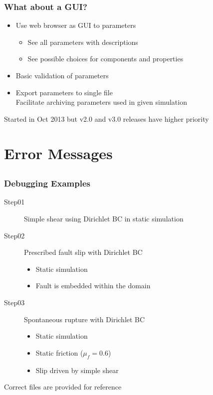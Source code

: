 \documentclass{beamer}
\begin{document}
\begin{frame}
  \frametitle{What about a GUI?}

  \begin{itemize}
  \item Use web browser as GUI to parameters
    \begin{itemize}
    \item See all parameters with descriptions
    \item See possible choices for components and properties
    \end{itemize}
  \item Basic validation of parameters
  \item Export parameters to single file\\
    Facilitate archiving parameters used in given simulation
  \end{itemize}

  \vfill
  Started in Oct 2013 but v2.0 and v3.0 releases have higher priority
  
\end{frame}


\section{Error Messages}
\subsection{}

\begin{frame}
  \frametitle{Debugging Examples}

  \begin{description}
  \item[Step01] Simple shear using Dirichlet BC in static simulation
  \item[Step02] Prescribed fault slip with Dirichlet BC
    \begin{itemize}
    \item Static simulation
    \item Fault is embedded within the domain
    \end{itemize}
  \item[Step03] Spontaneous rupture with Dirichlet BC
    \begin{itemize}
    \item Static simulation
    \item Static friction ($\mu_f=0.6$)
    \item Slip driven by simple shear
    \end{itemize}
  \end{description}
  \vfill
  Correct files are provided for reference
  
\end{frame}
\end{document}
